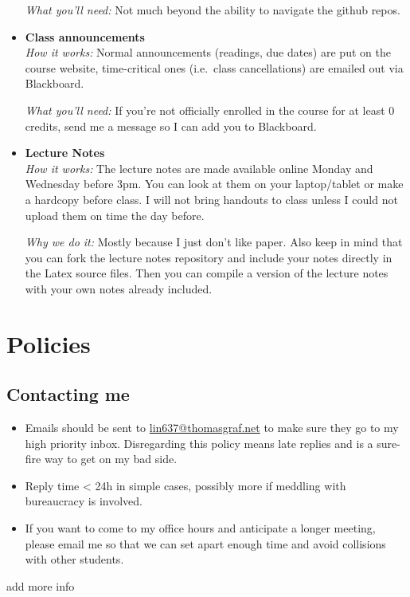 \begin{itemize}
        \emph{What you'll need:}
        Not much beyond the ability to navigate the github repos.

    \item \textbf{Class announcements}\\
        \emph{How it works:}
        Normal announcements (readings, due dates) are put on the course website, time-critical ones (i.e.\ class cancellations) are emailed out via Blackboard.
        
        \emph{What you'll need:}
        If you're not officially enrolled in the course for at least 0 credits, send me a message so I can add you to Blackboard.

    \item \textbf{Lecture Notes}\\
        \emph{How it works:}
        The lecture notes are made available online Monday and Wednesday before 3pm.
        You can look at them on your laptop\slash tablet or make a hardcopy before class.
        I will not bring handouts to class unless I could not upload them on time the day before.

        \emph{Why we do it:}
        Mostly because I just don't like paper.
        Also keep in mind that you can fork the lecture notes repository and include your notes directly in the Latex source files.
        Then you can compile a version of the lecture notes with your own notes already included.
\end{itemize}


\section{Policies}

\subsection{Contacting me}
\begin{itemize}
    \item Emails should be sent to \href{mailto://lin637@thomasgraf.net}{lin637@thomasgraf.net} to make sure they go to my high priority inbox.
        Disregarding this policy means late replies and is a sure-fire way to get on my bad side.
    \item Reply time < 24h in simple cases, possibly more if meddling with bureaucracy is involved.
    \item If you want to come to my office hours and anticipate a longer meeting, please email me so that we can set apart enough time and avoid collisions with other students.
\end{itemize}



\begin{literature}
add more info
\end{literature}
